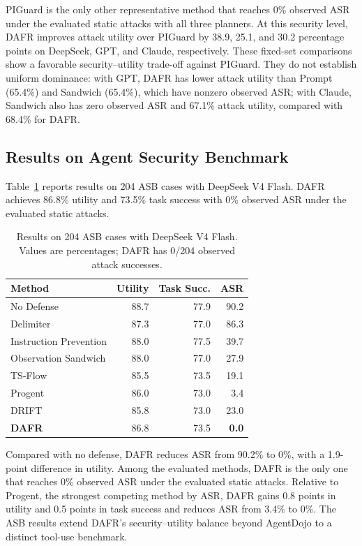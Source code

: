 \documentclass[11pt]{article}
\begin{document}
PIGuard is the only other representative method that reaches 0\% observed ASR under the evaluated static attacks with all three planners. At this security level, DAFR improves attack utility over PIGuard by 38.9, 25.1, and 30.2 percentage points on DeepSeek, GPT, and Claude, respectively. These fixed-set comparisons show a favorable security--utility trade-off against PIGuard. They do not establish uniform dominance: with GPT, DAFR has lower attack utility than Prompt (65.4\%) and Sandwich (65.4\%), which have nonzero observed ASR; with Claude, Sandwich also has zero observed ASR and 67.1\% attack utility, compared with 68.4\% for DAFR.

\subsection{Results on Agent Security Benchmark}

Table~\ref{tab:asb-main} reports results on 204 ASB cases with DeepSeek V4 Flash. DAFR achieves 86.8\% utility and 73.5\% task success with 0\% observed ASR under the evaluated static attacks.

\begin{table}[!ht]
\centering
\small
\setlength{\tabcolsep}{4pt}
\begin{tabular}{lrrr}
\toprule
Method & Utility & Task Succ. & ASR\\
\midrule
No Defense & 88.7 & 77.9 & 90.2\\
Delimiter & 87.3 & 77.0 & 86.3\\
Instruction Prevention & 88.0 & 77.5 & 39.7\\
Observation Sandwich & 88.0 & 77.0 & 27.9\\
TS-Flow & 85.5 & 73.5 & 19.1\\
Progent & 86.0 & 73.0 & 3.4\\
DRIFT & 85.8 & 73.0 & 23.0\\
\textbf{DAFR} & 86.8 & 73.5 & \textbf{0.0}\\
\bottomrule
\end{tabular}
\caption{Results on 204 ASB cases with DeepSeek V4 Flash. Values are percentages; DAFR has 0/204 observed attack successes.}
\label{tab:asb-main}
\end{table}

Compared with no defense, DAFR reduces ASR from 90.2\% to 0\%, with a 1.9-point difference in utility. Among the evaluated methods, DAFR is the only one that reaches 0\% observed ASR under the evaluated static attacks. Relative to Progent, the strongest competing method by ASR, DAFR gains 0.8 points in utility and 0.5 points in task success and reduces ASR from 3.4\% to 0\%. The ASB results extend DAFR's security--utility balance beyond AgentDojo to a distinct tool-use benchmark.
\end{document}
